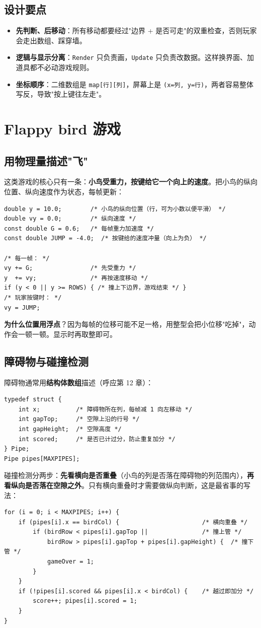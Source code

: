 \subsection{设计要点}
\begin{itemize}
  \item \textbf{先判断、后移动}：所有移动都要经过"边界 + 是否可走"的双重检查，否则玩家会走出数组、踩穿墙。
  \item \textbf{逻辑与显示分离}：\texttt{Render} 只负责画，\texttt{Update} 只负责改数据。这样换界面、加道具都不必动游戏规则。
  \item \textbf{坐标顺序}：二维数组是 \texttt{map[行][列]}，屏幕上是 \texttt{(x=列, y=行)}，两者容易整体写反，导致"按上键往左走"。
\end{itemize}

\section{Flappy bird 游戏}
\subsection{用物理量描述"飞"}
这类游戏的核心只有一条：\textbf{小鸟受重力，按键给它一个向上的速度}。把小鸟的纵向位置、纵向速度作为状态，每帧更新：
\begin{lstlisting}
double y = 10.0;        /* 小鸟的纵向位置（行，可为小数以便平滑） */
double vy = 0.0;        /* 纵向速度 */
const double G = 0.6;   /* 每帧重力加速度 */
const double JUMP = -4.0;  /* 按键给的速度冲量（向上为负） */

/* 每一帧： */
vy += G;                /* 先受重力 */
y  += vy;               /* 再按速度移动 */
if (y < 0 || y >= ROWS) { /* 撞上下边界，游戏结束 */ }
/* 玩家按键时： */
vy = JUMP;
\end{lstlisting}
\textbf{为什么位置用浮点}？因为每帧的位移可能不足一格，用整型会把小位移"吃掉"，动作会一顿一顿。显示时再取整即可。

\subsection{障碍物与碰撞检测}
障碍物通常用\textbf{结构体数组}描述（呼应第 12 章）：
\begin{lstlisting}
typedef struct {
    int x;          /* 障碍物所在列，每帧减 1 向左移动 */
    int gapTop;     /* 空隙上沿的行号 */
    int gapHeight;  /* 空隙高度 */
    int scored;     /* 是否已计过分，防止重复加分 */
} Pipe;
Pipe pipes[MAXPIPES];
\end{lstlisting}
碰撞检测分两步：\textbf{先看横向是否重叠}（小鸟的列是否落在障碍物的列范围内），\textbf{再看纵向是否落在空隙之外}。只有横向重叠时才需要做纵向判断，这是最省事的写法：
\begin{lstlisting}
for (i = 0; i < MAXPIPES; i++) {
    if (pipes[i].x == birdCol) {                       /* 横向重叠 */
        if (birdRow < pipes[i].gapTop ||               /* 撞上管 */
            birdRow > pipes[i].gapTop + pipes[i].gapHeight) {  /* 撞下管 */
            gameOver = 1;
        }
    }
    if (!pipes[i].scored && pipes[i].x < birdCol) {    /* 越过即加分 */
        score++; pipes[i].scored = 1;
    }
}
\end{lstlisting}

